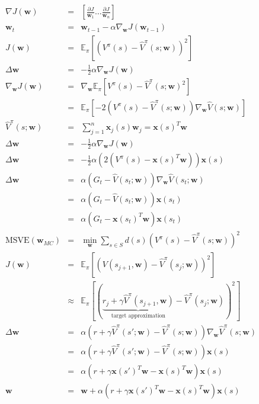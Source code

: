 \documentclass[]{article}
\newcommand{\vect}[1]{\mathbf{#1}}
\begin{document}
\begin{eqnarray}
    \nabla J(\vect{w}) &=& \left[ \frac{\partial J}{\vect{w}_1} \ldots \frac{\partial J}{\vect{w}_n} \right]\\
    \vect{w}_t &=& \vect{w}_{t-1} - \alpha \nabla_{\vect{w}} J(\vect{w}_{t-1})\\
    J(\vect{w}) &=& \mathbb{E}_{\pi} [(V^\pi(s) - \hat{V}^\pi(s;\vect{w}))^2]\\
    \Delta \vect{w} &=& - \frac{1}{2} \alpha \nabla_{\vect{w}} J(\vect{w})\\
    \nabla_{\vect{w}} J(\vect{w}) &=& \nabla_{\vect{w}} \mathbb{E}_{\pi}[V^\pi (s) - \hat{V}^\pi (s; \vect{w})^2]\\
    &=& \mathbb{E}_\pi [-2 (V^\pi(s) - \hat{V}^\pi (s;\vect{w})) \nabla_{\vect{w}} \hat{V}(s;\vect{w})]\\
    \hat{V}^\pi(s; \vect{w}) &=& \sum_{j=1}^n \vect{x}_j (s) \vect{w}_j = \vect{x}(s)^T\vect{w}\\
    \Delta \vect{w} &=& - \frac{1}{2} \alpha \nabla_{\vect{w}} J (\vect{w})\\
    \Delta \vect{w} &=& -\frac{1}{2} \alpha(2(V^\pi(s) - \vect{x}(s)^T \vect{w})) \vect{x}(s)\\
    \Delta \vect{w} &=& \alpha (G_t - \hat{V} (s_t; \vect{w})) \nabla_{\vect{w}}\hat{V}(s_t; \vect{w})\\
    &=& \alpha (G_t - \hat{V} (s_t; \vect{w})) \vect{x}(s_t) \\
    &=& \alpha (G_t - \vect{x}(s_t)^T \vect{w}) \vect{x}(s_t) \\
    \text{MSVE}(\vect{w}_{MC}) &=& \min_{\vect{w}}\sum_{s \in S} d(s) (V^\pi (s) - \hat{V}^\pi(s;\vect{w}))^2 \\
    J(\vect{w}) &=& \mathbb{E}_\pi [(V(s_{j+1}, \vect{w}) - \hat{V}^\pi(s_j;\vect{w}))^2]\\
    &\approx& \mathbb{E}_\pi [(\underbrace{r_j + \gamma \hat{V}^\pi(s_{j+1}, \vect{w})}_{\text{target approximation}} - \hat{V}^\pi(s_j;\vect{w}))^2]\\
    \Delta \vect{w} &=& \alpha( r + \gamma \hat{V}^\pi(s'; \vect{w}) - \hat{V}^\pi(s;\vect{w})) \nabla_{\vect{w}} \hat{V}^\pi (s;\vect{w})\\
    &=& \alpha( r + \gamma \hat{V}^\pi(s'; \vect{w}) - \hat{V}^\pi(s;\vect{w})) \vect{x}(s)\\
    &=& \alpha( r + \gamma \vect{x}(s')^T \vect{w} - \vect{x}(s)^T\vect{w}) \vect{x}(s)\\
    \vect{w} &=& \vect{w} + \alpha( r + \gamma \vect{x}(s')^T \vect{w} - \vect{x}(s)^T\vect{w}) \vect{x}(s)\\

\end{eqnarray}
\end{document}
